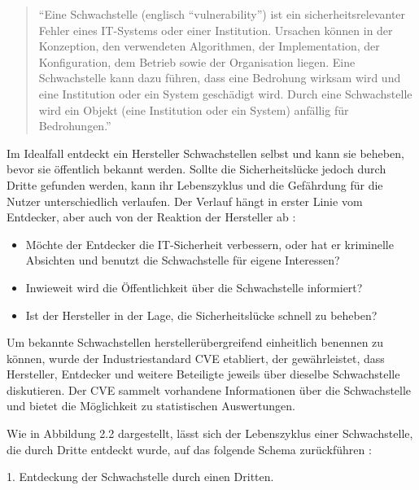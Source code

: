 \documentclass[12pt,oneside,a4paper,parskip,pointlessnumbers]{scrbook}
\begin{document}
  \begin{quote}``Eine Schwachstelle (englisch ``vulnerability'') ist ein sicherheitsrelevanter Fehler eines IT-Systems oder einer Institution. Ursachen können in der Konzeption, den verwendeten Algorithmen, der Implementation, der Konfiguration, dem Betrieb sowie der Organisation liegen. Eine Schwachstelle kann dazu führen, dass eine Bedrohung wirksam wird und eine Institution oder ein System geschädigt wird. Durch eine Schwachstelle wird ein Objekt (eine Institution oder ein System) anfällig für Bedrohungen.'' \cite[S.107]{BSI2}
  \end{quote}

  Im Idealfall entdeckt ein Hersteller Schwachstellen selbst und kann sie beheben, bevor sie öffentlich bekannt werden. Sollte die Sicherheitslücke jedoch durch Dritte gefunden werden, kann ihr Lebenszyklus und die Gefährdung für die Nutzer unterschiedlich verlaufen. Der Verlauf hängt in erster Linie vom Entdecker, aber auch von der Reaktion der Hersteller ab \cite{BSI3}:
  \begin{itemize}
    \item Möchte der Entdecker die IT-Sicherheit verbessern, oder hat er kriminelle Absichten und benutzt die Schwachstelle für eigene Interessen?
    \item Inwieweit wird die Öffentlichkeit über die Schwachstelle informiert?
    \item Ist der Hersteller in der Lage, die Sicherheitslücke schnell zu beheben?
  \end{itemize}
Um bekannte Schwachstellen herstellerübergreifend einheitlich benennen zu können, wurde der Industriestandard \ac{CVE} etabliert, der gewährleistet, dass Hersteller, Entdecker und weitere Beteiligte jeweils über dieselbe Schwachstelle diskutieren. Der \ac{CVE} sammelt vorhandene Informationen über die Schwachstelle und bietet die Möglichkeit zu statistischen Auswertungen.

  Wie in Abbildung 2.2 dargestellt, lässt sich der Lebenszyklus einer Schwachstelle, die durch Dritte entdeckt wurde, auf das folgende Schema zurückführen \cite{BSI3}:

  1. Entdeckung der Schwachstelle durch einen Dritten.
\end{document}
